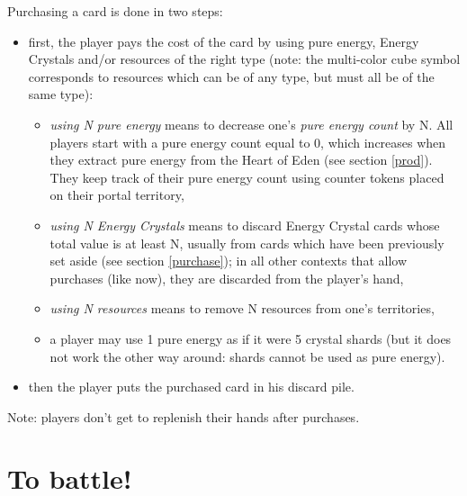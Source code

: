\documentclass[a4paper]{article}
\begin{document}
\newpage
        Purchasing a card is done in two steps:
        \vspace{-1.3em}
        \begin{itemize}
            \item first, the player pays the cost of the card by using pure energy,
                Energy Crystals and/or resources of the right type
                (note: the multi-color cube symbol corresponds to resources
                which can be of any type, but must all be of the same type):
                \vspace{-0.5em}
                \begin{itemize}
                    \item \textit{using N pure energy} means to decrease one's
                    \textit{pure energy count} by N.
                    All players start with a pure energy count equal to 0,
                    which increases when they extract pure energy from the Heart of Eden
                    (see section \ref{prod}).
                    They keep track of their pure energy count using counter
                    tokens placed on their portal territory,
                    \item \textit{using N Energy Crystals} means to discard Energy Crystal
                        cards whose total value is at least N,
                        usually from cards which have been previously set aside
                        (see section \ref{purchase});
                        in all other contexts that allow purchases (like now),
                        they are discarded from the player's hand,
                    \item \textit{using N resources} means to remove N resources
                        from one's territories,
                    \item a player may use 1 pure energy as if it were 5 crystal shards
                    (but it does not work the other way around: shards cannot be used
                    as pure energy).
                \end{itemize}
            \item then the player puts the purchased card in his discard pile.
        \end{itemize}
        
        Note: players don't get to replenish their hands after purchases.


\section{To battle!}
\end{document}
